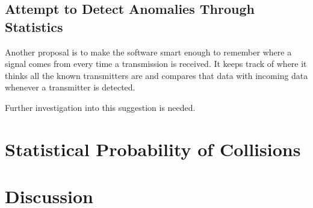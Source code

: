 \documentclass[12pt]{article}
\begin{document}
\subsection{Attempt to Detect Anomalies Through Statistics}

Another proposal is to make the software smart enough to remember where a
signal comes from every time a transmission is received. It keeps track of
where it thinks all the known transmitters are and compares that data with
incoming data whenever a transmitter is detected.

Further investigation into this suggestion is needed.

\section{Statistical Probability of Collisions}

\section{Discussion}
\end{document}
